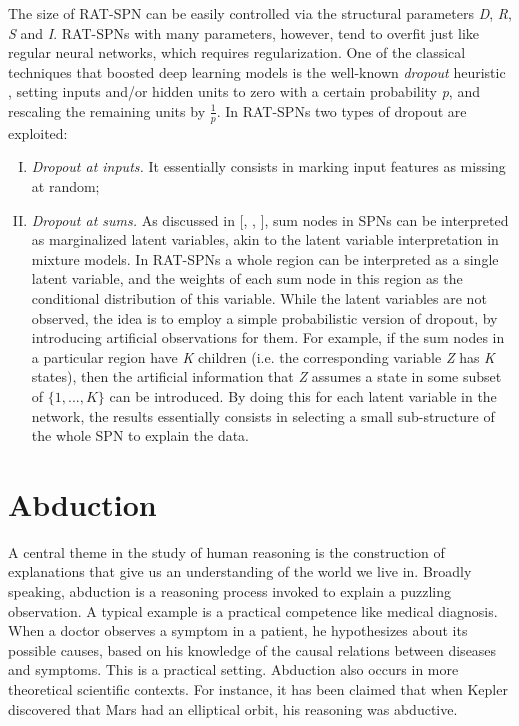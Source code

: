 The size of RAT-SPN can be easily controlled via the structural parameters \textit{D}, \textit{R}, \textit{S} and \textit{I}. RAT-SPNs with many parameters, however, tend to overfit just like regular neural networks, which requires regularization. One of the classical techniques that boosted deep learning models is the well-known \textit{dropout} heuristic \cite{srivastava2014dropout}, setting inputs and/or hidden units to zero with a certain probability \textit{p}, and rescaling the remaining units by $\frac{1}{\mathit{p}}$. In RAT-SPNs two types of dropout are exploited:

\begin{enumerate}[I.]
  \item \textit{Dropout at inputs.} It essentially consists in marking input features as missing at random;
  \item \textit{Dropout at sums.} As discussed in [\cite{poon2011sum}, \cite{DBLP:journals/corr/ZhaoMP15}, \cite{DBLP:journals/corr/PeharzGPD16}], sum nodes in SPNs can be interpreted as marginalized latent variables, akin to the latent variable interpretation in mixture models. In RAT-SPNs a whole region can be interpreted as a single latent variable, and the weights of each sum node in this region as the conditional distribution of this variable. While the latent variables are not observed, the idea is to employ a simple probabilistic version of dropout, by introducing artificial observations for them. For example, if the sum nodes in a particular region have \textit{K} children (i.e. the corresponding variable \textit{Z} has \textit{K} states), then the artificial information that \textit{Z} assumes a state in some subset of $\{1,...,\mathit{K}\}$ can be introduced. By doing this for each latent variable in the network, the results essentially consists in selecting a small sub-structure of the whole SPN to explain the data. 
\end{enumerate}

\section{Abduction}
A central theme in the study of human reasoning is the construction of explanations that give us an understanding of the world we live in. Broadly speaking, abduction is a reasoning process invoked to explain a puzzling observation. A typical example is a practical competence like medical diagnosis. When a doctor observes a symptom in a patient, he hypothesizes about its possible causes, based on his knowledge of the causal relations between diseases and symptoms. This is a practical setting. Abduction also occurs in more theoretical scientific contexts. For instance, it has been claimed \cite{Peirce1932} that when Kepler discovered that Mars had an elliptical orbit, his reasoning was abductive.

